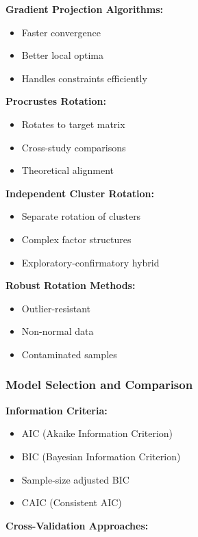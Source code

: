 \documentclass[
]{article}
\begin{document}
\textbf{Gradient Projection Algorithms:}

\begin{itemize}
\item
  Faster convergence
\item
  Better local optima
\item
  Handles constraints efficiently
\end{itemize}

\textbf{Procrustes Rotation:}

\begin{itemize}
\item
  Rotates to target matrix
\item
  Cross-study comparisons
\item
  Theoretical alignment
\end{itemize}

\textbf{Independent Cluster Rotation:}

\begin{itemize}
\item
  Separate rotation of clusters
\item
  Complex factor structures
\item
  Exploratory-confirmatory hybrid
\end{itemize}

\textbf{Robust Rotation Methods:}

\begin{itemize}
\item
  Outlier-resistant
\item
  Non-normal data
\item
  Contaminated samples
\end{itemize}

\subsubsection{Model Selection and Comparison}

\textbf{Information Criteria:}

\begin{itemize}
\item
  AIC (Akaike Information Criterion)
\item
  BIC (Bayesian Information Criterion)
\item
  Sample-size adjusted BIC
\item
  CAIC (Consistent AIC)
\end{itemize}

\textbf{Cross-Validation Approaches:}
\end{document}
